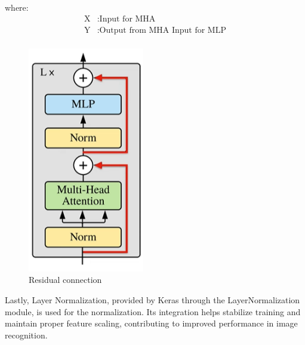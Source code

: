 \noindent where:
\begin{align*}
    \text{X} & : \text{Input for MHA}                 \\
    \text{Y} & : \text{Output from MHA Input for MLP} \\
\end{align*}
\begin{figure}[htbp]
    \centering
    \includegraphics[width=2in]{img/residual connection.png}
    \caption{{Residual connection}}
\end{figure}

Lastly, Layer Normalization, provided by Keras through the LayerNormalization module, is used for the normalization. Its integration helps stabilize training and maintain proper feature scaling, contributing to improved performance in image recognition.

\newpage